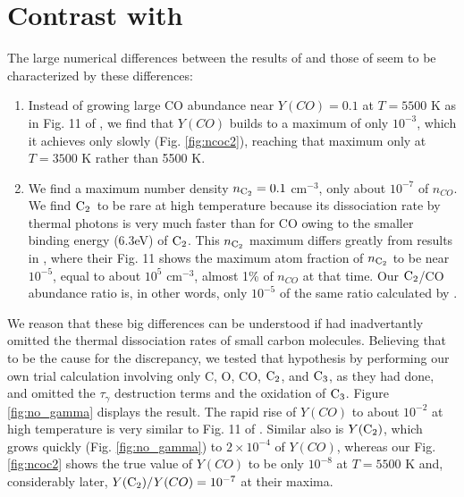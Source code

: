 \documentclass[manuscript]{aastex}
\newcommand{\ctwo}{{\rm C}_2}
\newcommand{\cthree}{{\rm C}_3}
\begin{document}
\section{Contrast with \citet{2009ApJ...703..642C,2010ApJ...713....1C}}

The large numerical differences between the results of
\citet{1999Sci...283.1290C,2001ApJ...562..480C}
and those of \citet{2009ApJ...703..642C,2010ApJ...713....1C}
seem to be characterized by these differences:
\begin{enumerate}

\item Instead of growing large CO abundance near $Y(CO)=0.1$ at $T=5500$ K
as in Fig. 11 of \citet{2009ApJ...703..642C}, we find that $Y(CO)$
builds to a maximum of only $10^{-3}$, which it achieves only slowly
(Fig. \ref{fig:ncoc2}), reaching that maximum only at $T=3500$ K rather
than 5500 K.

\item We find a maximum number density $n_{\ctwo} = 0.1$ cm$^{-3}$,
only about $10^{-7}$ of
$n_{CO}$. We find $\ctwo$\ to be rare at high temperature because its
dissociation rate by thermal photons is very much faster than for CO
owing to the smaller binding energy (6.3eV) of $\ctwo$. This $n_{\ctwo}$
maximum differs greatly from results in \citet{2009ApJ...703..642C},
where their Fig. 11 shows the maximum atom fraction of $n_{\ctwo}$ to be
near $10^{-5}$, equal to about $10^5$ cm$^{-3}$, almost 1\% of
$n_{CO}$ at that time. Our $\ctwo$/CO abundance ratio is,
in other words, only $10^{-5}$ of the same ratio calculated by
\citet{2009ApJ...703..642C}.

\end{enumerate}
We reason that these big differences can be understood if
\citet{2009ApJ...703..642C} had inadvertantly omitted the thermal
dissociation rates of small carbon molecules. Believing that to be the
cause for the discrepancy, we tested that hypothesis by performing our
own trial calculation involving only C, O, CO, $\ctwo$, and $\cthree$,
as they had done,
and omitted the $\tau_\gamma$ destruction terms and the oxidation of $\cthree$.
Figure \ref{fig:no_gamma} displays the result.
The rapid rise of $Y(CO)$ to about $10^{-2}$ at high temperature is very 
similar to Fig. 11 of \citet{2009ApJ...703..642C}.
Similar also is $Y(\ctwo)$,
which grows quickly (Fig. \ref{fig:no_gamma}) to $2 \times 10^{-4}$ of $Y(CO)$,
whereas our Fig. \ref{fig:ncoc2} shows the true value of $Y(CO)$ to be
only $10^{-8}$ at $T=5500$ K and, considerably later,
$Y(\ctwo)/Y(CO) = 10^{-7}$ at their maxima. 
\end{document}
